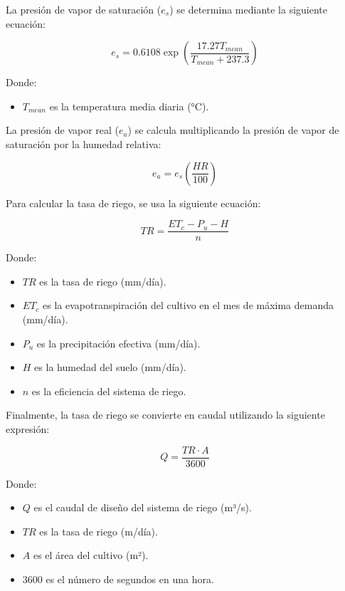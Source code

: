 \documentclass{article}  %
\begin{document}
La presión de vapor de saturación ($e_s$) se determina mediante la siguiente ecuación:

\begin{equation}
  e_s = 0.6108 \exp \left( \frac{17.27 T_{mean}}{T_{mean} + 237.3} \right)
\end{equation}

Donde:

\begin{itemize}
  \item $T_{mean}$ es la temperatura media diaria (°C).
\end{itemize}

La presión de vapor real ($e_a$) se calcula multiplicando la presión de vapor de saturación por la humedad relativa:

\begin{equation}
  e_a = e_s \left( \frac{HR}{100} \right)
\end{equation}

Para calcular la tasa de riego, se usa la siguiente ecuación:

\begin{equation}
  TR = \frac{ET_c - P_u - H}{n}
\end{equation}

Donde:

\begin{itemize}
  \item $TR$ es la tasa de riego (mm/día).
  \item $ET_c$ es la evapotranspiración del cultivo en el mes de máxima demanda (mm/día).
  \item $P_u$ es la precipitación efectiva (mm/día).
  \item $H$ es la humedad del suelo (mm/día).
  \item $n$ es la eficiencia del sistema de riego.
\end{itemize}

Finalmente, la tasa de riego se convierte en caudal utilizando la siguiente expresión:

\begin{equation}
  Q = \frac{TR \cdot A}{3600}
\end{equation}

Donde:

\begin{itemize}
  \item $Q$ es el caudal de diseño del sistema de riego (m³/s).
  \item $TR$ es la tasa de riego (m/día).
  \item $A$ es el área del cultivo (m²).
  \item $3600$ es el número de segundos en una hora.
\end{itemize}
\end{document}

